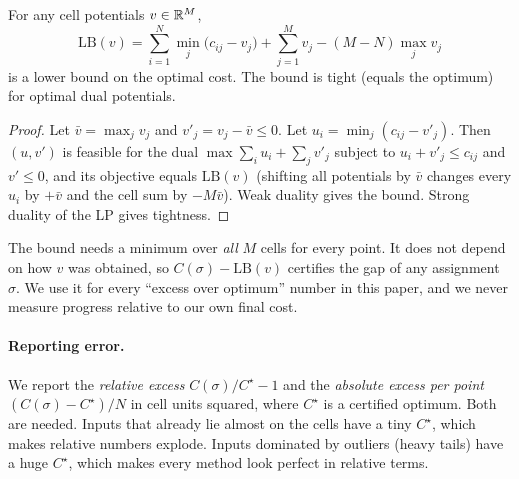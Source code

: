 \begin{proposition}\label{prop:lb}
For any cell potentials $v\in\mathbb{R}^M$,
\[
  \mathrm{LB}(v) = \sum_{i=1}^N \min_{j} \bigl(c_{ij}-v_j\bigr) + \sum_{j=1}^M v_j - (M-N)\max_j v_j
\]
is a lower bound on the optimal cost. The bound is tight (equals the optimum) for
optimal dual potentials.
\end{proposition}
\begin{proof}
Let $\bar v=\max_j v_j$ and $v'_j=v_j-\bar v\le0$. Let $u_i=\min_j(c_{ij}-v'_j)$. Then
$(u,v')$ is feasible for the dual $\max\sum_i u_i+\sum_j v'_j$ subject to
$u_i+v'_j\le c_{ij}$ and $v'\le0$, and its objective equals $\mathrm{LB}(v)$ (shifting all
potentials by $\bar v$ changes every $u_i$ by $+\bar v$ and the cell sum by $-M\bar v$).
Weak duality gives the bound. Strong duality of the LP gives tightness.
\end{proof}

The bound needs a minimum over \emph{all} $M$ cells for every point. It does not depend
on how $v$ was obtained, so $C(\sigma)-\mathrm{LB}(v)$ certifies the gap of any
assignment $\sigma$. We use it for every ``excess over optimum'' number in this paper,
and we never measure progress relative to our own final cost.

\paragraph{Reporting error.} We report the \emph{relative excess}
$C(\sigma)/C^\star-1$ and the \emph{absolute excess per point} $(C(\sigma)-C^\star)/N$ in
cell units squared, where $C^\star$ is a certified optimum. Both are needed.
Inputs that already lie almost on the cells have a tiny $C^\star$, which makes
relative numbers explode. Inputs dominated by outliers (heavy tails) have a huge
$C^\star$, which makes every method look perfect in relative terms.
